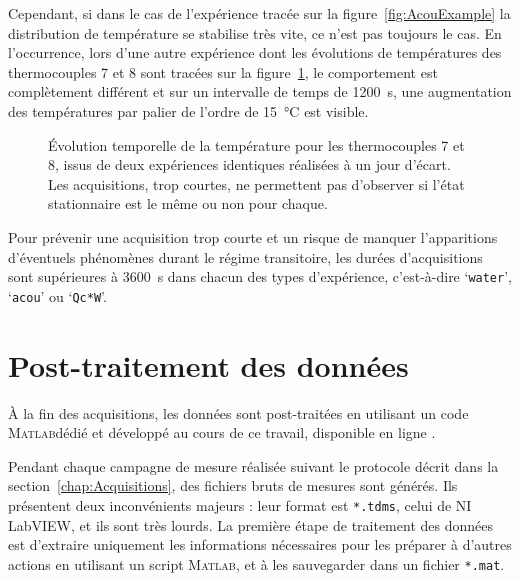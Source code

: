 Cependant, si dans le cas de l'expérience tracée sur la figure~\ref{fig:AcouExample} la distribution de température se stabilise très vite, ce n'est pas toujours le cas. En l'occurrence, lors d'une autre expérience dont les évolutions de températures des thermocouples 7 et 8 sont tracées sur la figure~\ref{fig:Repetabilite_V1}, le comportement est complètement différent et sur un intervalle de temps de \qty{1200}{\second}, une augmentation des températures par palier de l'ordre de \qty{15}{\degreeCelsius} est visible.\smallskip

\begin{figure}[!ht]
    \centering
    
    \caption{\'Evolution temporelle de la température pour les thermocouples 7 et 8, issus de deux expériences identiques réalisées à un jour d'écart. Les acquisitions, trop courtes, ne permettent pas d'observer si l'état stationnaire est le même ou non pour chaque.}
    \label{fig:Repetabilite_V1}
\end{figure}

Pour prévenir une acquisition trop courte et un risque de manquer l'apparitions d'éventuels phénomènes durant le régime transitoire, les durées d'acquisitions sont supérieures à \qty{3600}{\second} dans chacun des types d'expérience, c'est-à-dire `\texttt{water}', `\texttt{acou}' ou `\texttt{Qc*W}'.


\section{Post-traitement des données}\label{chap:PostTraitement}
À la fin des acquisitions, les données sont post-traitées en utilisant un code \textsc{Matlab}\textss\textregistered dédié et développé au cours de ce travail, disponible en ligne \cite{fontbonne_postprocessing_2025}.\medskip

Pendant chaque campagne de mesure réalisée suivant le protocole décrit dans la section~\ref{chap:Acquisitions}, des fichiers bruts de mesures sont générés. Ils présentent deux inconvénients majeurs : leur format est \texttt{*.tdms}, celui de NI LabVIEW, et ils sont très lourds. La première étape de traitement des données est d'extraire uniquement les informations nécessaires pour les préparer à d'autres actions en utilisant un script \textsc{Matlab}\textss\textregistered, et à les sauvegarder dans un fichier \texttt{*.mat}.\medskip

